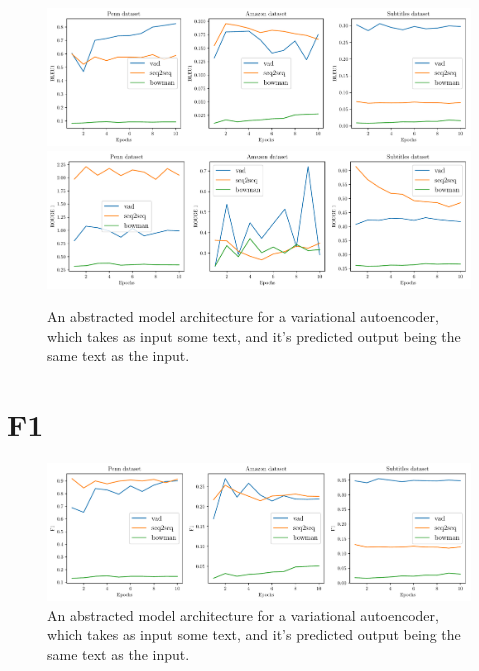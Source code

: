 \documentclass[12pt,twoside]{report}
\begin{document}
\begin{figure}[!ht]
	\centering
	\includegraphics[width=150mm]{results/bleu1.pdf}
	\includegraphics[width=150mm]{results/rouge_1.pdf}
	\caption{An abstracted model architecture for a variational autoencoder, which takes as input some text, and it's predicted output being the same text as the input.\label{r:bleu_rouge}}
  \end{figure}





\section{F1}

\begin{figure}[!ht]
	\centering
	\includegraphics[width=150mm]{results/f1.pdf}
	\caption{An abstracted model architecture for a variational autoencoder, which takes as input some text, and it's predicted output being the same text as the input.\label{r:f1}}
  \end{figure}


\end{document}
